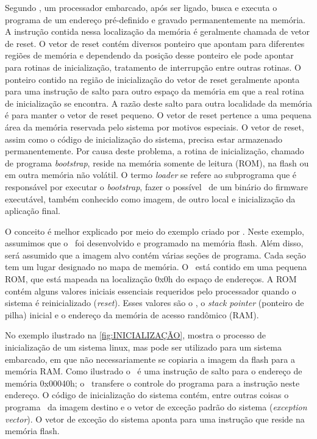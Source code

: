 Segundo , um processador embarcado, após ser ligado, busca e executa o programa de um endereço pré-definido e gravado permanentemente na memória. A instrução contida nessa localização da memória é geralmente chamada de vetor de reset. O vetor de reset contém diversos ponteiro que apontam para diferentes regiões de memória e dependendo da posição desse ponteiro ele pode apontar para rotinas de inicialização, tratamento de interrupção entre outras rotinas.
O ponteiro contido na região de inicialização do vetor de reset geralmente aponta para uma instrução de salto para outro espaço da memória em que a real rotina de inicialização se encontra. A razão deste salto para outra localidade da memória é para manter o vetor de reset pequeno. O vetor de reset pertence a uma pequena área da memória reservada pelo sistema por motivos especiais. O vetor de reset, assim como o código de inicialização do sistema, precisa estar armazenado permanentemente. Por causa deste problema, a rotina de inicialização, chamado de programa \textit{bootstrap}, reside na memória somente de leitura (ROM), na flash ou em outra memória não volátil. O termo \textit{loader} se refere ao subprograma que é responsável por executar o \textit{bootstrap}, fazer o possível \download\ de um binário do firmware executável, também conhecido como imagem, de outro local e inicialização da aplicação final.

O conceito é melhor explicado por meio do exemplo criado por . Neste exemplo, assumimos que o \loader\ foi desenvolvido e programado na memória flash. Além disso, será assumido que a imagem alvo contém várias seções de programa. Cada seção tem um lugar designado no mapa de memória. O \resetv\ está contido em uma pequena ROM, que está mapeada na localização 0x0h do espaço de endereços. A ROM contém alguns valores iniciais essenciais requeridos pelo processador quando o sistema é reinicializado (\textit{reset}). Esses valores são o \resetv, o \textit{stack pointer} (ponteiro de pilha) inicial e o endereço da memória de acesso randômico (RAM). 

No exemplo ilustrado na \autoref{fig:INICIALIZAÇÃO}, mostra o processo de inicialização de um sistema linux, mas pode ser utilizado para um sistema embarcado, em que não necessariamente se copiaria a imagem da flash para a memória RAM. Como ilustrado o \resetv\ é uma instrução de salto para o endereço de memória 0x00040h; o \resetv\ transfere o controle do programa para a instrução neste endereço. O código de inicialização do sistema contém, entre outras coisas o programa \loader\ da imagem destino e o vetor de exceção padrão do sistema (\textit{exception vector}). O vetor de exceção do sistema aponta para uma instrução que reside na memória flash.

